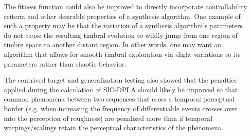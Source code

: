 \documentclass[12pt]{report} 	%
\numberwithin{figure}{chapter}
\numberwithin{table}{chapter}
\numberwithin{equation}{chapter}
\begin{document}
\begin{flushleft}
The fitness function could also be improved to directly incorporate controllability criteria and other desirable properties of a synthesis algorithm. One example of such a property may be that the variation of a synthesis algorithm's parameters do not cause the resulting timbral evolution to wildly jump from one region of timbre space to another distant region. In other words, one may want an algorithm that allows for smooth timbral exploration via slight variations to its parameters rather than chaotic behavior.

The contrived target and generalization testing also showed that the penalties applied during the calculation of SIC-DPLA should likely be improved so that common phenomena between two sequences that cross a temporal perceptual border (e.g. when increasing the frequency of differentiable events crosses over into the perception of roughness) are penalized more than if temporal warpings/scalings retain the perceptual characteristics of the phenomena.

\renewcommand\bibname{BIBLIOGRAPHY}
\linespread{1}					%
\newpage
\nocite{*}	%
\setlength{}
\end{flushleft}
\end{document}
